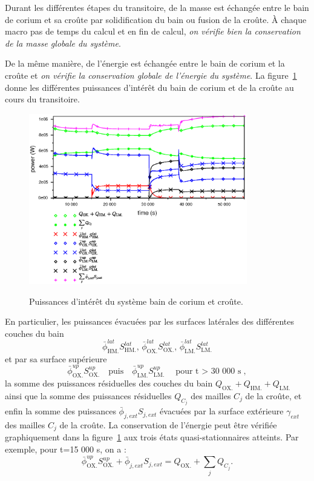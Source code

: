 Durant les différentes étapes du transitoire, de la masse est échangée entre le bain de corium et sa croûte par solidification du bain ou fusion de la croûte. À chaque macro pas de temps du calcul et en fin de calcul, \emph{on vérifie bien la conservation de la masse globale du système}.

De la même manière, de l'énergie est échangée entre le bain de corium et la croûte et \emph{on vérifie la conservation globale de l'énergie du système}. La figure~\ref{fig:thermal_balance} donne les différentes puissances d'intérêt du bain de corium et de la croûte au cours du transitoire.
\begin{figure}
\centering
\includegraphics[width=0.85\textwidth, keepaspectratio=true]{Figures/thermal_balance.eps}\\
\caption{Puissances d'intérêt du système bain de corium et croûte.}
\label{fig:thermal_balance}
\end{figure}
En particulier, les puissances évacuées par les surfaces latérales des différentes couches du bain 
\begin{equation*}
\bar{\phi}^{lat}_\textrm{HM.}S^{lat}_\textrm{HM.},\,\bar{\phi}^{lat}_\textrm{OX.}S^{lat}_\textrm{OX.},\,\bar{\phi}^{lat}_\textrm{LM.}S^{lat}_\textrm{LM.}
\end{equation*}
et par sa surface supérieure 
\begin{equation*}
\bar{\phi}^{up}_\textrm{OX.}S^{up}_\textrm{OX.}\quad\text{puis}\quad\bar{\phi}^{up}_\textrm{LM.}S^{up}_\textrm{LM.}\quad\text{pour t $>$ 30 000 s},
\end{equation*}
la somme des puissances résiduelles des couches du bain $Q_\textrm{OX.}+Q_\textrm{HM.}+Q_\textrm{LM.}$ ainsi que la somme des puissances résiduelles $Q_{C_j}$ des mailles $C_j$ de la croûte, et enfin la somme des puissances $\bar{\phi}_{j,ext}S_{j,ext}$ évacuées par la surface extérieure $\gamma_{ext}$ des mailles $C_j$ de la croûte. La conservation de l'énergie peut être vérifiée graphiquement dans la figure~\ref{fig:thermal_balance} aux trois états quasi-stationnaires atteints. Par exemple, pour t=15 000 s, on a :
\begin{equation}
\bar{\phi}^{up}_\textrm{OX.}S^{up}_\textrm{OX.} + \bar{\phi}_{j,ext}S_{j,ext} = Q_\textrm{OX.} + \sum_j Q_{C_j}.
\end{equation}

